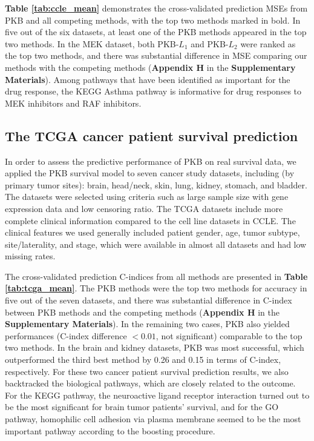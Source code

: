 \documentclass[a4paper,12pt]{article}
\begin{document}
\textbf{Table \ref{tab:ccle_mean}} demonstrates the cross-validated prediction MSEs from PKB and all competing methods, with the top two methods marked in bold. In five out of the six datasets, at least one of the PKB methods appeared in the top two methods. In the MEK dataset, both PKB-$L_1$ and PKB-$L_2$ were ranked as the top two methods, and there was substantial difference in MSE comparing our methods with the competing methods (\textbf{Appendix H} in the \textbf{Supplementary Materials}). Among pathways that have been identified as important for the drug response, the KEGG Asthma pathway is informative for drug responses to MEK inhibitors and RAF inhibitors.  


\subsection{The TCGA cancer patient survival prediction}

In order to assess the predictive performance of PKB on real survival data, we applied the PKB survival model to seven cancer study datasets, including (by primary tumor sites): brain, head/neck, skin, lung, kidney, stomach, and bladder. The datasets were selected using criteria such as large sample size with gene expression data and low censoring ratio. The TCGA datasets include more complete clinical information compared to the cell line datasets in CCLE. The clinical features we used generally included patient gender, age, tumor subtype, site/laterality, and stage, which were available in almost all datasets and had low missing rates. 

The cross-validated prediction C-indices from all methods are presented in \textbf{Table \ref{tab:tcga_mean}}. The PKB methods were the top two methods for accuracy in five out of the seven datasets, and there was substantial difference in C-index between PKB methods and the competing methods (\textbf{Appendix H} in the \textbf{Supplementary Materials}). In the remaining two cases, PKB also yielded performances (C-index difference $< 0.01$, not significant) comparable to the top two methods. In the brain and kidney datasets, PKB was most successful, which outperformed the third best method by 0.26 and 0.15 in terms of C-index, respectively. For these two cancer patient survival prediction results, we also backtracked the biological pathways, which are closely related to the outcome. For the KEGG pathway, the neuroactive ligand receptor interaction turned out to be the most significant for brain tumor patients' survival, and for the GO pathway, homophilic cell adhesion via plasma membrane seemed to be the most important pathway according to the boosting procedure. 
\end{document}
